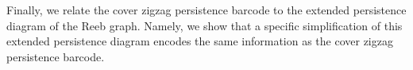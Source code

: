 Finally, we  relate the cover zigzag persistence barcode to the extended persistence diagram of the Reeb graph.
Namely, we show that a specific simplification of this extended persistence diagram encodes the same information as the 
cover zigzag persistence barcode. %


%




